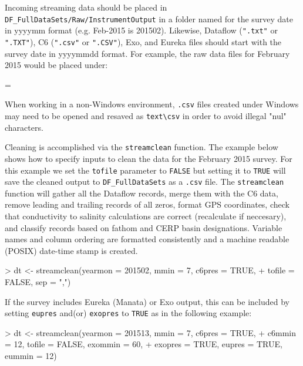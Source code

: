 \documentclass[12pt]{article}
\newenvironment{warning}
{\par\begin{mdframed}[linewidth=2pt,linecolor=red]
\begin{list}{}{\leftmargin=1cm
  \labelwidth=\leftmargin}\item[\Large\ding{43}]}
{\end{list}\end{mdframed}\par}
\begin{document}
Incoming streaming data should be placed in \verb|DF_FullDataSets|\texttt{/Raw/InstrumentOutput} in a folder named for the survey date in yyyymm format (e.g. Feb-2015 is 201502). Likewise, Dataflow (\texttt{".txt"} or \texttt{".TXT"}), C6 (\texttt{".csv"} or \texttt{".CSV"}), Exo, and Eureka  files should start with the survey date in yyyymmdd format. For example, the raw data files for February 2015 would be placed under:


\begin{warning}
When working in a non-Windows environment, \texttt{.csv} files created under Windows may need to be opened and resaved as \texttt{text}\verb|\csv| in order to avoid illegal "nul" characters.
\end{warning}

\vspace{15pt}
Cleaning is accomplished via the \nohyphens{\texttt{streamclean}} function. The example below shows how to specify inputs to clean the data for the February 2015 survey. For this example we set the \texttt{tofile} parameter to \texttt{FALSE} but setting it to \texttt{TRUE} will save the cleaned output to \verb|DF_FullDataSets| as a \texttt{.csv} file. The \texttt{streamclean} function will gather all the Dataflow records, merge them with the C6 data, remove leading and trailing records of all zeros, format GPS coordinates, check that conductivity to salinity calculations are correct (recalculate if neccesary), and classify records based on fathom and CERP basin designations. Variable names and column ordering are formatted consistently and a machine readable (POSIX) date-time stamp is created.   

\begin{Schunk}
\begin{Sinput}
> dt <- streamclean(yearmon = 201502, mmin = 7, c6pres = TRUE,
+                   tofile = FALSE, sep = ",")
\end{Sinput}
\end{Schunk}

If the survey includes Eureka (Manata) or Exo output, this can be included by setting \texttt{eupres} and(or) \texttt{exopres} to \texttt{TRUE} as in the following example:

\begin{Schunk}
\begin{Sinput}
> dt <- streamclean(yearmon = 201513, mmin = 7, c6pres = TRUE,
+                   c6mmin = 12, tofile = FALSE, exommin = 60,
+                   exopres = TRUE, eupres = TRUE, eummin = 12)
\end{Sinput}
\end{Schunk}
\end{document}
